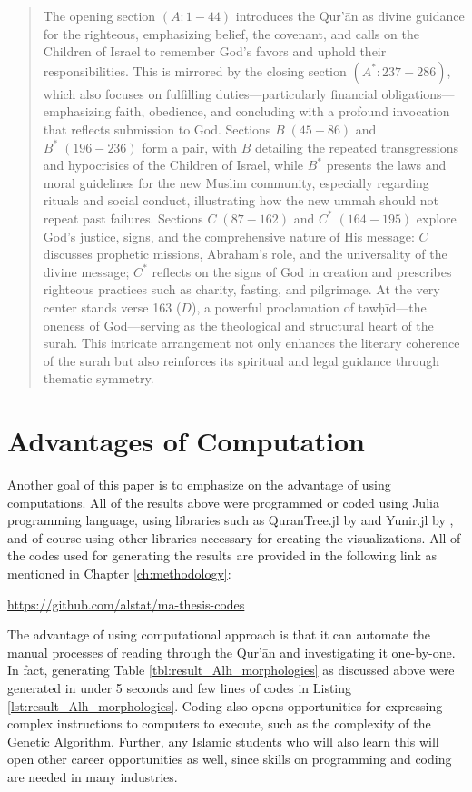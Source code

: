 \begin{quotation}
    The opening section $(A: 1-44)$ introduces the Qur'\=an as divine guidance for the righteous, emphasizing belief, the covenant, and calls on the Children of Israel to remember God's favors and uphold their responsibilities. This is mirrored by the closing section $(A^*: 237-286)$, which also focuses on fulfilling duties—particularly financial obligations—emphasizing faith, obedience, and concluding with a profound invocation that reflects submission to God. Sections $B\;(45-86)$ and $B^*\;(196-236)$ form a pair, with $B$ detailing the repeated transgressions and hypocrisies of the Children of Israel, while $B^*$ presents the laws and moral guidelines for the new Muslim community, especially regarding rituals and social conduct, illustrating how the new ummah should not repeat past failures. Sections $C\;(87-162)$ and $C^*\;(164-195)$ explore God's justice, signs, and the comprehensive nature of His message: $C$ discusses prophetic missions, Abraham's role, and the universality of the divine message; $C^*$ reflects on the signs of God in creation and prescribes righteous practices such as charity, fasting, and pilgrimage. At the very center stands verse 163 ($D$), a powerful proclamation of tawḥīd—the oneness of God—serving as the theological and structural heart of the surah. This intricate arrangement not only enhances the literary coherence of the surah but also reinforces its spiritual and legal guidance through thematic symmetry.
\end{quotation}

\section{Advantages of Computation}
Another goal of this paper is to emphasize on the advantage of using computations. All of the results above were programmed or coded using Julia programming language, using libraries such as QuranTree.jl by  and Yunir.jl by , and of course using other libraries necessary for creating the visualizations. All of the codes used for generating the results are provided in the following link as mentioned in Chapter \ref{ch:methodology}:
\begin{center}
\url{https://github.com/alstat/ma-thesis-codes}
\end{center}
The advantage of using computational approach is that it can automate the manual processes of reading through the Qur'\=an and investigating it one-by-one. In fact, generating Table \ref{tbl:result_Alh_morphologies} as discussed above were generated in under 5 seconds and few lines of codes in Listing \ref{lst:result_Alh_morphologies}. Coding also opens opportunities for expressing complex instructions to computers to execute, such as the complexity of the Genetic Algorithm. Further, any Islamic students who will also learn this will open other career opportunities as well, since skills on programming and coding are needed in many industries.
